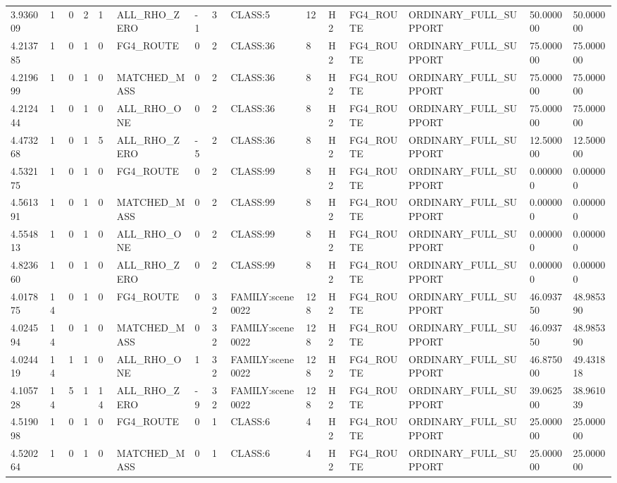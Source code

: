 \begin{tabular}{lllllllllllllll}
3.936009 & 1 & 0 & 2 & 1 & ALL\_RHO\_ZERO & -1 & 3 & CLASS:5 & 12 & H2 & FG4\_ROUTE & ORDINARY\_FULL\_SUPPORT & 50.000000 & 50.000000 \\
4.213785 & 1 & 0 & 1 & 0 & FG4\_ROUTE & 0 & 2 & CLASS:36 & 8 & H2 & FG4\_ROUTE & ORDINARY\_FULL\_SUPPORT & 75.000000 & 75.000000 \\
4.219699 & 1 & 0 & 1 & 0 & MATCHED\_MASS & 0 & 2 & CLASS:36 & 8 & H2 & FG4\_ROUTE & ORDINARY\_FULL\_SUPPORT & 75.000000 & 75.000000 \\
4.212444 & 1 & 0 & 1 & 0 & ALL\_RHO\_ONE & 0 & 2 & CLASS:36 & 8 & H2 & FG4\_ROUTE & ORDINARY\_FULL\_SUPPORT & 75.000000 & 75.000000 \\
4.473268 & 1 & 0 & 1 & 5 & ALL\_RHO\_ZERO & -5 & 2 & CLASS:36 & 8 & H2 & FG4\_ROUTE & ORDINARY\_FULL\_SUPPORT & 12.500000 & 12.500000 \\
4.532175 & 1 & 0 & 1 & 0 & FG4\_ROUTE & 0 & 2 & CLASS:99 & 8 & H2 & FG4\_ROUTE & ORDINARY\_FULL\_SUPPORT & 0.000000 & 0.000000 \\
4.561391 & 1 & 0 & 1 & 0 & MATCHED\_MASS & 0 & 2 & CLASS:99 & 8 & H2 & FG4\_ROUTE & ORDINARY\_FULL\_SUPPORT & 0.000000 & 0.000000 \\
4.554813 & 1 & 0 & 1 & 0 & ALL\_RHO\_ONE & 0 & 2 & CLASS:99 & 8 & H2 & FG4\_ROUTE & ORDINARY\_FULL\_SUPPORT & 0.000000 & 0.000000 \\
4.823660 & 1 & 0 & 1 & 0 & ALL\_RHO\_ZERO & 0 & 2 & CLASS:99 & 8 & H2 & FG4\_ROUTE & ORDINARY\_FULL\_SUPPORT & 0.000000 & 0.000000 \\
4.017875 & 14 & 0 & 1 & 0 & FG4\_ROUTE & 0 & 32 & FAMILY:scene0022 & 128 & H2 & FG4\_ROUTE & ORDINARY\_FULL\_SUPPORT & 46.093750 & 48.985390 \\
4.024594 & 14 & 0 & 1 & 0 & MATCHED\_MASS & 0 & 32 & FAMILY:scene0022 & 128 & H2 & FG4\_ROUTE & ORDINARY\_FULL\_SUPPORT & 46.093750 & 48.985390 \\
4.024419 & 14 & 1 & 1 & 0 & ALL\_RHO\_ONE & 1 & 32 & FAMILY:scene0022 & 128 & H2 & FG4\_ROUTE & ORDINARY\_FULL\_SUPPORT & 46.875000 & 49.431818 \\
4.105728 & 14 & 5 & 1 & 14 & ALL\_RHO\_ZERO & -9 & 32 & FAMILY:scene0022 & 128 & H2 & FG4\_ROUTE & ORDINARY\_FULL\_SUPPORT & 39.062500 & 38.961039 \\
4.519098 & 1 & 0 & 1 & 0 & FG4\_ROUTE & 0 & 1 & CLASS:6 & 4 & H2 & FG4\_ROUTE & ORDINARY\_FULL\_SUPPORT & 25.000000 & 25.000000 \\
4.520264 & 1 & 0 & 1 & 0 & MATCHED\_MASS & 0 & 1 & CLASS:6 & 4 & H2 & FG4\_ROUTE & ORDINARY\_FULL\_SUPPORT & 25.000000 & 25.000000 \\

\end{tabular}

